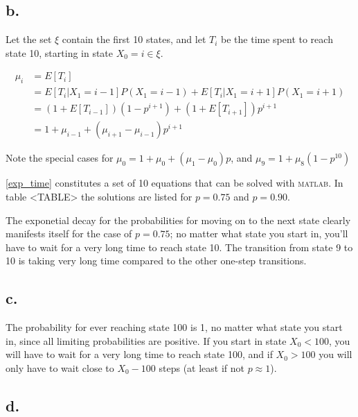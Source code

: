 \subsection*{b.}

Let the set $\xi$ contain the first 10 states, and let $T_i$ be the time spent to reach state 10, starting in state $X_0 = i \in \xi$. 


\begin{equation}
\label{exp_time}
\begin{aligned}
 \mu_i &= E[T_i] \\
       &= E[T_{i}|X_1 = i-1]P(X_1=i-1) + E[T_{i}|X_1 = i+1]P(X_1=i+1) \\
       &= ( 1+E[T_{i-1}] )( 1-p^{i+1} ) + ( 1+E[T_{i+1}] )p^{i+1} \\
       &= 1 + \mu_{i-1} + ( \mu_{i+1} - \mu_{i-1} )p^{i+1}
\end{aligned}
\end{equation}

Note the special cases for $\mu_0 = 1 + \mu_0 + (\mu_1 - \mu_0)p$, and $\mu_9 = 1 + \mu_8(1-p^{10})$

\cref{exp_time} constitutes a set of 10 equations that can be solved with \textsc{matlab}. 
In table <TABLE> the solutions are listed for $p=0.75$ and $p=0.90$.


The exponetial decay for the probabilities for moving on to the next state  clearly manifests itself for the case of $p=0.75$; no matter what state you start in, you'll have to wait for a very long time to reach state 10. The transition from state 9 to 10 is taking very long time compared to the other one-step transitions. 


\subsection*{c.}

The probability for ever reaching state 100 is 1, no matter what state you start in, since all limiting probabilities are positive. If you start in state $X_0<100$, you will have to wait for a very long time to reach state 100, and if $X_0>100$ you will only have to wait close to $X_0 - 100$ steps (at least if not $p \approx 1$).


\subsection*{d.}



